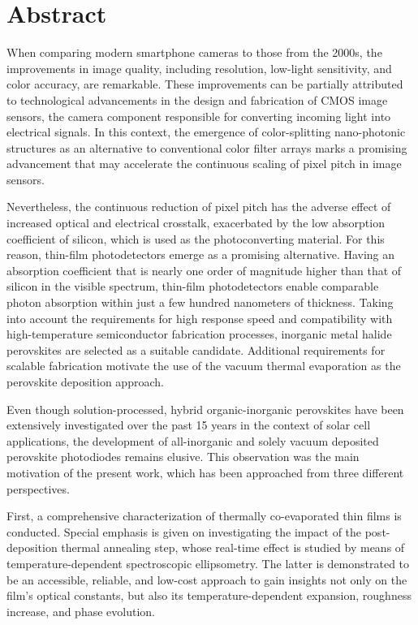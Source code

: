 \chapter{Abstract}                                 \label{ch:abstract}

When comparing modern smartphone cameras to those from the 2000s, the improvements in image quality, including resolution, low-light sensitivity, and color accuracy, are remarkable. These improvements can be partially attributed to technological advancements in the design and fabrication of CMOS image sensors, the camera component responsible for converting incoming light into electrical signals. In this context, the emergence of color-splitting nano-photonic structures as an alternative to conventional color filter arrays marks a promising advancement that may accelerate the continuous scaling of pixel pitch in image sensors.

Nevertheless, the continuous reduction of pixel pitch has the adverse effect of increased optical and electrical crosstalk, exacerbated by the low absorption coefficient of silicon, which is used as the photoconverting material. For this reason, thin-film photodetectors emerge as a promising alternative. Having an absorption coefficient that is nearly one order of magnitude higher than that of silicon in the visible spectrum, thin-film photodetectors enable comparable photon absorption within just a few hundred nanometers of thickness. Taking into account the requirements for high response speed and compatibility with high-temperature semiconductor fabrication processes, inorganic metal halide perovskites are selected as a suitable candidate. Additional requirements for scalable fabrication motivate the use of the vacuum thermal evaporation as the perovskite deposition approach. 

Even though solution-processed, hybrid organic-inorganic perovskites have been extensively investigated over the past 15 years in the context of solar cell applications, the development of all-inorganic and solely vacuum deposited perovskite photodiodes remains elusive. This observation was the main motivation of the present work, which has been approached from three different perspectives.

First, a comprehensive characterization of thermally co-evaporated  thin films is conducted. Special emphasis is given on investigating the impact of the post-deposition thermal annealing step, whose real-time effect is studied by means of temperature-dependent spectroscopic ellipsometry. The latter is demonstrated to be an accessible, reliable, and low-cost approach to gain insights not only on the film's optical constants, but also its temperature-dependent expansion, roughness increase, and phase evolution. 

